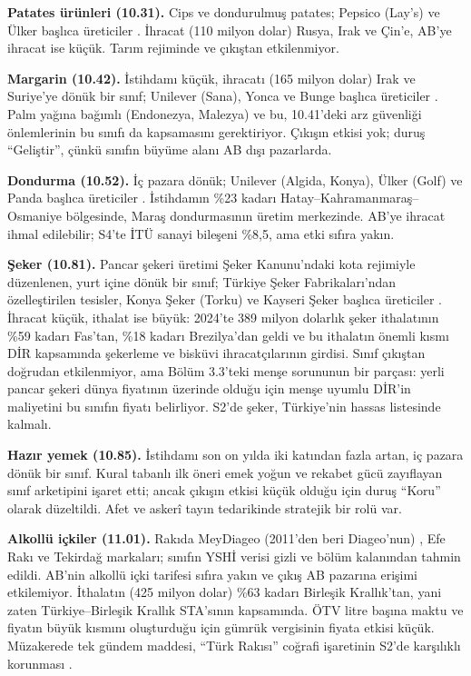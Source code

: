 \textbf{Patates ürünleri (10.31).} Cips ve dondurulmuş patates; Pepsico (Lay's) ve Ülker başlıca üreticiler \etiketH{}. İhracat (110 milyon dolar) Rusya, Irak ve Çin'e, AB'ye ihracat ise küçük. Tarım rejiminde ve çıkıştan etkilenmiyor.

\textbf{Margarin (10.42).} İstihdamı küçük, ihracatı (165 milyon dolar) Irak ve Suriye'ye dönük bir sınıf; Unilever (Sana), Yonca ve Bunge başlıca üreticiler \etiketH{}. Palm yağına bağımlı (Endonezya, Malezya) ve bu, 10.41'deki arz güvenliği önlemlerinin bu sınıfı da kapsamasını gerektiriyor. Çıkışın etkisi yok; duruş ``Geliştir'', çünkü sınıfın büyüme alanı AB dışı pazarlarda.

\textbf{Dondurma (10.52).} İç pazara dönük; Unilever (Algida, Konya), Ülker (Golf) ve Panda başlıca üreticiler \etiketH{}. İstihdamın \%23 kadarı Hatay--Kahramanmaraş--Osmaniye bölgesinde, Maraş dondurmasının üretim merkezinde. AB'ye ihracat ihmal edilebilir; S4'te İTÜ sanayi bileşeni \%8,5, ama etki sıfıra yakın.

\textbf{Şeker (10.81).} Pancar şekeri üretimi Şeker Kanunu'ndaki kota rejimiyle düzenlenen, yurt içine dönük bir sınıf; Türkiye Şeker Fabrikaları'ndan özelleştirilen tesisler, Konya Şeker (Torku) ve Kayseri Şeker başlıca üreticiler \etiketH{}. İhracat küçük, ithalat ise büyük: 2024'te 389 milyon dolarlık şeker ithalatının \%59 kadarı Fas'tan, \%18 kadarı Brezilya'dan geldi ve bu ithalatın önemli kısmı DİR kapsamında şekerleme ve bisküvi ihracatçılarının girdisi. Sınıf çıkıştan doğrudan etkilenmiyor, ama Bölüm 3.3'teki menşe sorununun bir parçası: yerli pancar şekeri dünya fiyatının üzerinde olduğu için menşe uyumlu DİR'in maliyetini bu sınıfın fiyatı belirliyor. S2'de şeker, Türkiye'nin hassas listesinde kalmalı.

\textbf{Hazır yemek (10.85).} İstihdamı son on yılda iki katından fazla artan, iç pazara dönük bir sınıf. Kural tabanlı ilk öneri emek yoğun ve rekabet gücü zayıflayan sınıf arketipini işaret etti; ancak çıkışın etkisi küçük olduğu için duruş ``Koru'' olarak düzeltildi. Afet ve askerî tayın tedarikinde stratejik bir rolü var.

\textbf{Alkollü içkiler (11.01).} Rakıda Mey\textbar Diageo (2011'den beri Diageo'nun) \etiketV{}, Efe Rakı ve Tekirdağ markaları; sınıfın YSHİ verisi gizli ve bölüm kalanından tahmin edildi. AB'nin alkollü içki tarifesi sıfıra yakın ve çıkış AB pazarına erişimi etkilemiyor. İthalatın (425 milyon dolar) \%63 kadarı Birleşik Krallık'tan, yani zaten Türkiye--Birleşik Krallık STA'sının kapsamında. ÖTV litre başına maktu ve fiyatın büyük kısmını oluşturduğu için gümrük vergisinin fiyata etkisi küçük. Müzakerede tek gündem maddesi, ``Türk Rakısı'' coğrafi işaretinin S2'de karşılıklı korunması \etiketD{}.

